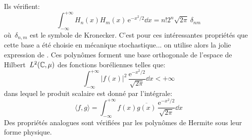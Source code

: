  Ils vérifient: 
\begin{equation}
 \int_{-\infty}^{+\infty} H_n(x)H_m(x)\,\mathrm{e}^{-x^2/2}\dd x=n!2^n\sqrt{2\pi}~\delta_{nm} 
\end{equation}
où~$\delta_{n,m}$ est le symbole de Kronecker. C'est pour ces intéressantes propriétés que cette base a été choisie en mécanique stochastique... on utilise alors la jolie expression de . Ces polynômes forment une base orthogonale de l'espace de Hilbert~$L^2(\mathbb C,\mu)$ des fonctions boréliennes telles que: 
\begin{equation}
\int_{-\infty}^{+\infty}|f(x)|^2\,\frac{\mathrm{e}^{-x^2/2}}{\sqrt{2\pi}}\dd x< +\infty
\end{equation}
dans lequel le produit scalaire est donné par l'intégrale: 
\begin{equation}
\langle f,g\rangle=\int_{-\infty}^{+\infty} f(x)\overline{g(x)}\,\frac{\mathrm{e}^{-x^2/2}}{\sqrt{2\pi}}\dd x
\end{equation}
Des propriétés analogues sont vérifiées par les polynômes de Hermite sous leur forme physique. 
